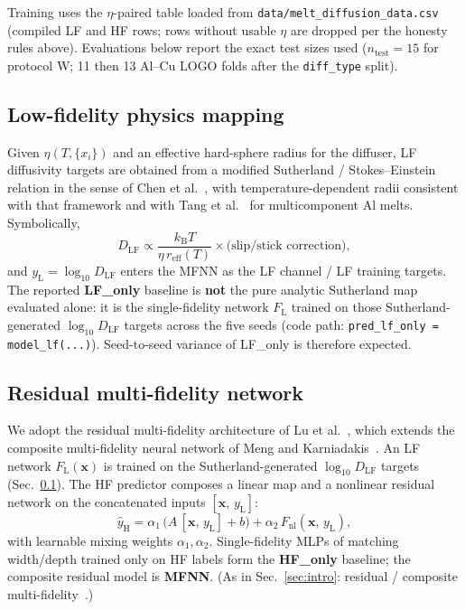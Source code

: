 \documentclass[review,12pt]{elsarticle}
\begin{document}
Training uses the $\eta$-paired table loaded from \texttt{data/melt\_diffusion\_data.csv} (compiled LF and HF rows; rows without usable $\eta$ are dropped per the honesty rules above). Evaluations below report the exact test sizes used ($n_{\mathrm{test}}=15$ for protocol W; 11 then 13 Al--Cu LOGO folds after the \texttt{diff\_type} split).

\subsection{Low-fidelity physics mapping}
\label{sec:lf}

Given $\eta(T,\{x_i\})$ and an effective hard-sphere radius for the diffuser, LF diffusivity targets are obtained from a modified Sutherland / Stokes--Einstein relation in the sense of Chen et al.~\cite{chen2014}, with temperature-dependent radii consistent with that framework and with Tang et al.~\cite{tang2015} for multicomponent Al melts. Symbolically,
\begin{equation}
\label{eq:sutherland}
D_{\mathrm{LF}} \propto \frac{k_{\mathrm{B}} T}{\eta\, r_{\mathrm{eff}}(T)}\times \text{(slip/stick correction)},
\end{equation}
and $y_{\mathrm{L}}=\log_{10} D_{\mathrm{LF}}$ enters the MFNN as the LF channel / LF training targets. The reported \textbf{LF\_only} baseline is \textbf{not} the pure analytic Sutherland map evaluated alone: it is the single-fidelity network $F_{\mathrm{L}}$ trained on those Sutherland-generated $\log_{10} D_{\mathrm{LF}}$ targets across the five seeds (code path: \texttt{pred\_lf\_only = model\_lf(...)}). Seed-to-seed variance of LF\_only is therefore expected.

\subsection{Residual multi-fidelity network}
\label{sec:mfnn}

We adopt the residual multi-fidelity architecture of Lu et al.~\cite{lu2020pnas}, which extends the composite multi-fidelity neural network of Meng and Karniadakis~\cite{meng2020jcp}. An LF network $F_{\mathrm{L}}(\mathbf{x})$ is trained on the Sutherland-generated $\log_{10} D_{\mathrm{LF}}$ targets (Sec.~\ref{sec:lf}). The HF predictor composes a linear map and a nonlinear residual network on the concatenated inputs $[\mathbf{x},\, y_{\mathrm{L}}]$:
\begin{equation}
\label{eq:residual}
\hat{y}_{\mathrm{H}}
=
\alpha_1\,
\bigl(A\,[\mathbf{x},\, y_{\mathrm{L}}]+b\bigr)
+
\alpha_2\,
F_{\mathrm{nl}}(\mathbf{x},\, y_{\mathrm{L}}),
\end{equation}
with learnable mixing weights $\alpha_1,\alpha_2$. Single-fidelity MLPs of matching width/depth trained only on HF labels form the \textbf{HF\_only} baseline; the composite residual model is \textbf{MFNN}. (As in Sec.~\ref{sec:intro}: residual / composite multi-fidelity~\cite{lu2020pnas,meng2020jcp}.)
\end{document}
